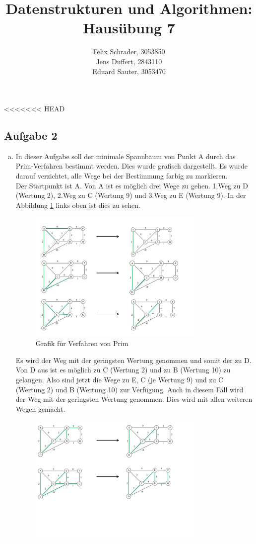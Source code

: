 \documentclass[11pt]{article}
\author{
  Felix Schrader, 3053850 \\ 
  Jens Duffert, 2843110 \\
  Eduard Sauter, 3053470
}
\title{Datenstrukturen und Algorithmen: Haus\"ubung 7}
\begin{document}
\maketitle
<<<<<<< HEAD
\subsection*{Aufgabe 2}
\begin{enumerate}[a)]
\item
In dieser Aufgabe soll der minimale Spannbaum von Punkt A durch das
Prim-Verfahren bestimmt werden. Dies wurde grafisch dargestellt. Es wurde
darauf verzichtet, alle Wege bei der Bestimmung farbig zu markieren.\\
Der Startpunkt ist A. Von A ist es möglich drei Wege zu gehen.
1.Weg zu D (Wertung 2), 2.Weg zu C (Wertung 9) und 3.Weg zu E (Wertung 9).
In der Abbildung \ref{fig:a1} links oben ist dies zu sehen.
\begin{figure}[h!]
	\centering
	\includegraphics[width=0.8\textwidth]{aufgabe2ateil1.png}
	\caption{Grafik für Verfahren von Prim}
	\label{fig:a1}
\end{figure}
Es wird der Weg mit der geringsten Wertung genommen und somit der zu D.
Von D aus ist es möglich zu C (Wertung 2) und zu B (Wertung 10) zu gelangen.
Also sind jetzt die Wege zu E, C (je Wertung 9) und zu C (Wertung 2) und B
(Wertung 10) zur Verfügung. Auch in diesem Fall wird der Weg mit der geringsten
Wertung genommen. Dies wird mit allen weiteren Wegen gemacht.
\begin{figure}[h!]
	\centering
	\includegraphics[width=0.8\textwidth]{aufgabe2ateil2.png}

\end{figure}
\end{enumerate}
\end{document}
